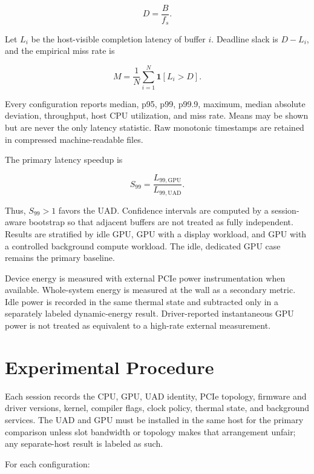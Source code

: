 \documentclass[10pt,twocolumn,twoside]{article}
\begin{document}
\begin{equation}
  D = \frac{B}{f_s}.
\end{equation}

Let $L_i$ be the host-visible completion latency of buffer $i$. Deadline slack
is $D-L_i$, and the empirical miss rate is

\begin{equation}
  M = \frac{1}{N}\sum_{i=1}^{N}\mathbf{1}[L_i>D].
\end{equation}

Every configuration reports median, p95, p99, p99.9, maximum, median absolute
deviation, throughput, host CPU utilization, and miss rate. Means may be shown
but are never the only latency statistic. Raw monotonic timestamps are retained
in compressed machine-readable files.

The primary latency speedup is

\begin{equation}
  S_{99} = \frac{L_{99,\mathrm{GPU}}}{L_{99,\mathrm{UAD}}}.
\end{equation}

Thus, $S_{99}>1$ favors the UAD. Confidence intervals are computed by a
session-aware bootstrap so that adjacent buffers are not treated as fully
independent. Results are stratified by idle GPU, GPU with a display workload,
and GPU with a controlled background compute workload. The idle, dedicated GPU
case remains the primary baseline.

Device energy is measured with external PCIe power instrumentation when
available. Whole-system energy is measured at the wall as a secondary metric.
Idle power is recorded in the same thermal state and subtracted only in a
separately labeled dynamic-energy result. Driver-reported instantaneous GPU
power is not treated as equivalent to a high-rate external measurement.

\section{Experimental Procedure}

Each session records the CPU, GPU, UAD identity, PCIe topology, firmware and
driver versions, kernel, compiler flags, clock policy, thermal state, and
background services. The UAD and GPU must be installed in the same host for the
primary comparison unless slot bandwidth or topology makes that arrangement
unfair; any separate-host result is labeled as such.

For each configuration:
\end{document}
